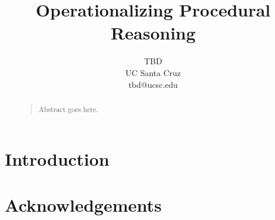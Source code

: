 \documentclass[letterpaper]{article}
\begin{document}
%
\title{Operationalizing Procedural Reasoning}
\author{
  TBD\\
  UC Santa Cruz\\
  tbd@ucsc.edu
}
\maketitle
\begin{abstract}
\begin{quote}

Abstract goes here.

\end{quote}
\end{abstract}

\section{Introduction}

\cite{daconceicao2013semi}

\section{Acknowledgements}



\end{document}

